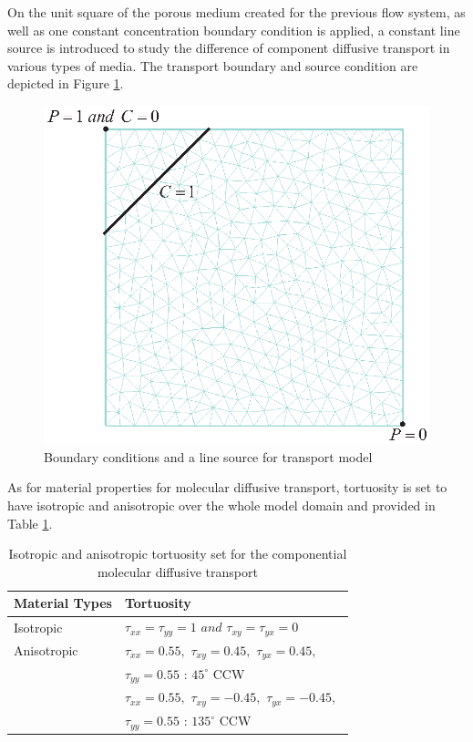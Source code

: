 On the unit square of the porous medium created for the previous flow system, as well as one constant concentration boundary condition is applied, a constant line source is introduced to study the difference of component diffusive transport in various types of media. The transport boundary and source condition are depicted in Figure \ref{gridtransport}.
\begin{figure}[H]
\centering
\includegraphics[scale=0.60]{Anisotropy/figures/gridtransport.eps}
\caption{Boundary conditions and a line source for transport model}
\label{gridtransport}
\end{figure}

As for material properties for molecular diffusive transport, tortuosity is set to have isotropic and anisotropic over the whole model domain and provided in Table \ref{tab:materials_tortuosity}.

\begin{table}[!htb]
\label{tab:materials_tortuosity}
\centering
\begin{tabular}{ll}
\hline\hline
{\smallskip}
Material Types & Tortuosity \\
\hline
Isotropic & $\tau _{xx}  = \tau _{yy}  = 1\,\,and\,\,\tau _{xy}  = \tau _{yx}  = 0$ \\
Anisotropic    & $\tau _{xx}  = 0.55,\,\,\tau _{xy}  = 0.45,\,\,\tau _{yx}  = 0.45,\,\,$ \\
&$\tau _{yy}  = 0.55$ : $45^ \circ  $ CCW \\
& $\tau _{xx}  = 0.55,\,\,\tau _{xy}  =  - 0.45,\,\,\tau _{yx}  =  - 0.45,\,\,$ \\
&$\tau _{yy}  = 0.55$ : $135^ \circ  $ CCW\\
\hline\hline
\end{tabular}
\caption{Isotropic and anisotropic tortuosity set for the componential molecular diffusive transport}
\end{table}

